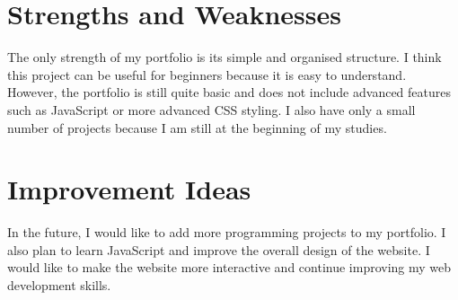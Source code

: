 \documentclass{article}
\begin{document}
\section{Strengths and Weaknesses}
The only strength of my portfolio is its simple and organised structure. I think this project can be useful for beginners because it is easy to understand. However, the portfolio is still quite basic and does not include advanced features such as JavaScript or more advanced CSS styling. I also have only a small number of projects because I am still at the beginning of my studies.
\section{Improvement Ideas}
In the future, I would like to add more programming projects to my portfolio. I also plan to learn JavaScript and improve the overall design of the website. I would like to make the website more interactive and continue improving my web development skills.
\end{document}
